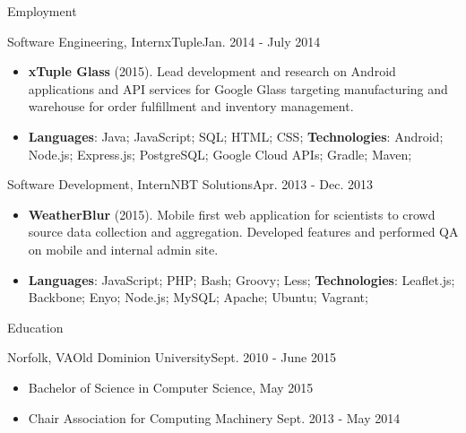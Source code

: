 \documentclass[]{mcdowellcv}
\begin{document}
\begin{cvsection}{Employment}
        \begin{cvsubsection}{Software Engineering, Intern}{xTuple}{Jan. 2014 - July 2014}
            \begin{itemize}
                \item \textbf{xTuple Glass} (2015). Lead development and research on Android applications and API services for Google Glass targeting manufacturing and warehouse for order fulfillment and inventory management.
            \end{itemize}
            \begin{itemize}
                 \item \textbf{Languages}: Java; JavaScript; SQL; HTML; CSS; \newline
                \textbf{Technologies}: Android; Node.js; Express.js; PostgreSQL; Google Cloud APIs; Gradle; Maven;
            \end{itemize}
        \end{cvsubsection}

        \begin{cvsubsection}{Software Development, Intern}{NBT Solutions}{Apr. 2013 - Dec. 2013}
            \begin{itemize}
                \item \textbf{WeatherBlur} (2015). Mobile first web application for scientists to crowd source data  collection and aggregation. Developed features and performed QA on mobile and internal admin site.
            \end{itemize}
            \begin{itemize}
                 \item \textbf{Languages}:  JavaScript; PHP;  Bash; Groovy; Less;\newline
                \textbf{Technologies}: Leaflet.js; Backbone; Enyo; Node.js; MySQL; Apache; Ubuntu; Vagrant;
            \end{itemize}
        \end{cvsubsection}

    \end{cvsection}

    \begin{cvsection}{Education}
        \begin{cvsubsection}{Norfolk, VA}{Old Dominion University}{Sept. 2010 - June 2015}
            \begin{itemize}
                \item  Bachelor of Science in Computer Science, May 2015
                \item Chair Association for Computing Machinery Sept. 2013 - May 2014
            \end{itemize}
        \end{cvsubsection}
    \end{cvsection}
\end{document}

